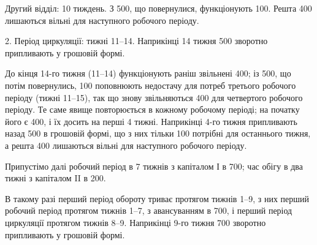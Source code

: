 Другий відділ: 10 тиждень. З 500, що повернулися, функціонують
100. Решта 400 лишаються вільні для наступного
робочого періоду.

2. Період циркуляції: тижні 11--14. Наприкінці 14 тижня 500 зворотно припливають у грошовій формі.

До кінця 14-го тижня (11--14) функціонують раніш звільнені 400; із 500, що потім повернулись, 100 поповнюють
недостачу для потреб третього робочого періоду (тижні 11--15),
так що знову звільняються 400 для четвертого робочого періоду.
Те саме явище повторюється в кожному робочому періоді; на
початку його є 400, і їх досить на перші 4 тижні. Наприкінці
4-го тижня припливають назад 500 в грошовій формі, що з
них тільки 100 потрібні для останнього тижня, а решта 400 лишаються вільні для наступного робочого періоду.

Припустімо далі робочий період в 7 тижнів з капіталом І в 700; час обігу в два тижні з капіталом II в 200.

В такому разі перший період обороту триває протягом тижнів 1--9,
з них перший робочий період протягом тижнів 1--7, з авансуванням
в 700, і перший період циркуляції протягом тижнів 8--9. Наприкінці
9-го тижня 700 зворотно припливають у грошовій формі.
